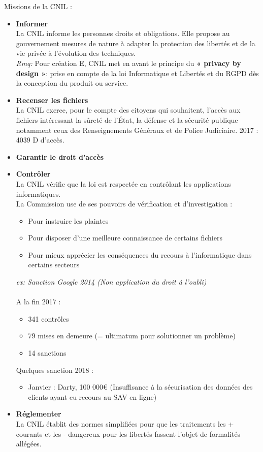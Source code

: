 \documentclass[a4paper,11pt]{report}
\begin{document}
Missions de la CNIL : \\
\begin{itemize}
    \item \textbf{Informer} \\
    La CNIL informe les personnes droits et obligations. Elle propose au gouvernement mesures de nature à adapter la protection des libertés et de la vie privée à l’évolution des techniques.\\
    \textit{Rmq:} Pour création E, CNIL met en avant le principe du \textbf{« privacy by design »}: prise en compte de la loi Informatique et Libertés et du RGPD dès la conception du produit ou service.\\
    \item \textbf{Recenser les fichiers} \\
    La CNIL exerce, pour le compte des citoyens qui souhaitent, l’accès aux fichiers intéressant la sûreté de l’État, la défense et la sécurité publique notamment ceux des Renseignements Généraux et de Police Judiciaire.
    2017 : 4039 D d’accès.\\
    \item \textbf{Garantir le droit d’accès}\\
    \item \textbf{Contrôler} \\
    La CNIL vérifie que la loi est respectée en contrôlant les applications informatiques.\\
    La Commission use de ses pouvoirs de vérification et d’investigation :
    \begin{itemize}
        \item Pour instruire les plaintes
        \item Pour disposer d’une meilleure connaissance de certains fichiers
        \item Pour mieux apprécier les conséquences du recours à l’informatique dans certains secteurs
    \end{itemize}
    \textit{ex: Sanction Google 2014 (Non application du droit à l’oubli)}\\ \\
    A la fin 2017 :
    \begin{itemize}
        \item 341 contrôles
        \item 79 mises en demeure (= ultimatum pour solutionner un problème)
        \item 14 sanctions \\
    \end{itemize}
    Quelques sanction 2018 :
    \begin{itemize}
        \item Janvier : Darty, 100 000€ (Insuffisance à la sécurisation des données des clients ayant eu recours au SAV en ligne)
    \end{itemize}
    \item \textbf{Réglementer} \\
    La CNIL établit des normes simplifiées pour que les traitements les + courants et les - dangereux pour les libertés fassent l’objet de formalités allégées.\\
\end{itemize}
\end{document}
